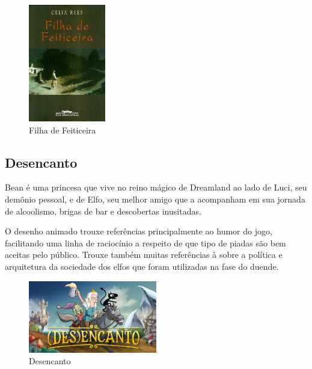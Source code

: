 \begin{figure}[!htb] \caption{\label{filha_feiticeira}Filha de Feiticeira}
    \begin{center}
    \includegraphics[width=0.3\textwidth]{imagens/feiticeira.jpeg} \end{center}
 \end{figure}



\subsection{Desencanto}

Bean é uma princesa que vive no reino mágico de Dreamland ao lado de Luci, seu demônio pessoal, e de Elfo, seu melhor amigo que a acompanham em sua jornada de alcoolismo, brigas de bar e descobertas inusitadas.

O desenho animado trouxe referências principalmente ao humor do jogo, facilitando uma linha de raciocínio a respeito de que tipo de piadas são bem aceitas pelo público. Trouxe também muitas referências à sobre a política e arquitetura da sociedade dos elfos que foram utilizadas na fase do duende.



\begin{figure}[!htb] \caption{\label{Desencanto}Desencanto} \begin{center}
\includegraphics[width=0.5\textwidth]{imagens/Desencanto.jpg} \end{center}
 \end{figure}

